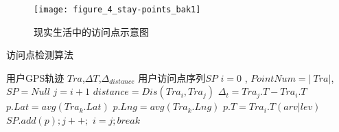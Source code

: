 
\begin{figure}[htp]
\centering
\texttt{[image: figure\_4\_stay-points\_bak1]}
\caption{现实生活中的访问点示意图}
\label{fig:staypoint}
\end{figure}

\begin{algorithm}[htb]
\wuhao
\caption{访问点检测算法}

\label{alg2_1staypoint}
\begin{algorithmic}[1] %
				\REQUIRE 用户GPS轨迹 $Tra$,$\Delta T$,$\Delta_{distance}$
				\ENSURE 用户访问点序列$SP$
				\STATE $i = 0$ , $PointNum= \left| \ Tra \right|$,$SP = Null$
				\STATE $j = i+1$
				\STATE $distance=Dis(Tra_{i},Tra_{j})$
				\STATE $\Delta_{t}=Tra_{j}.T-Tra_{i}.T$
				\STATE $p.Lat = avg(Tra_{k}.Lat)  $
				\STATE $p.Lng = avg(Tra_{k}.Lng)$
				\STATE $p.T = Tra_{i}.T(arv|lev)$%
				\STATE $SP .add(p) ;j++; $
				\ENDIF				
				\ENDIF				
				\ENDWHILE
				\STATE $i=j ; break$
				\ENDWHILE
\end{algorithmic}
\end{algorithm}


